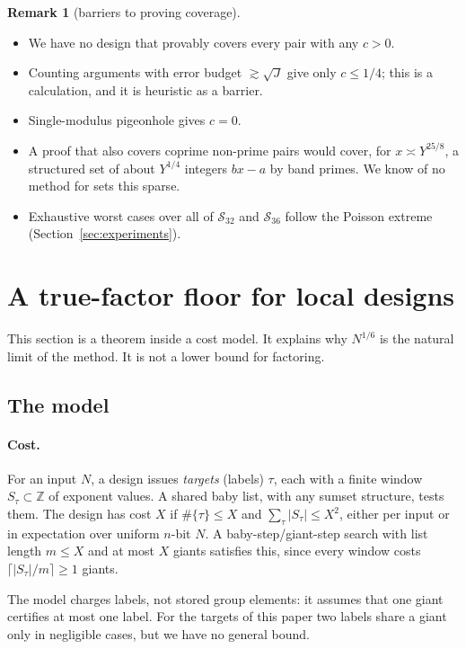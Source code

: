 \documentclass[11pt]{amsart}
\theoremstyle{definition}
\newtheorem{remark}[theorem]{Remark}
\newcommand{\Z}{\mathbb{Z}}
\begin{document}
\begin{remark}[barriers to proving coverage]
\begin{itemize}
\item We have no design that provably covers every pair with any $c>0$.
\item Counting arguments with error budget $\gtrsim\sqrt J$ give only $c\le1/4$; this is a
  calculation, and it is heuristic as a barrier.
\item Single-modulus pigeonhole gives $c=0$.
\item A proof that also covers coprime non-prime pairs would cover, for $x\asymp Y^{25/8}$, a
  structured set of about $Y^{1/4}$ integers $bx-a$ by band primes. We know of no method for sets
  this sparse.
\item Exhaustive worst cases over all of $\mathcal S_{32}$ and $\mathcal S_{36}$ follow the
  Poisson extreme (Section~\ref{sec:experiments}).
\end{itemize}
\end{remark}

\section{A true-factor floor for local designs}\label{sec:lower}

This section is a theorem inside a cost model. It explains why $N^{1/6}$ is the natural limit of
the method. It is not a lower bound for factoring.

\subsection{The model}
\paragraph{Cost.} For an input $N$, a design issues \emph{targets} (labels) $\tau$, each with a
finite window $S_\tau\subset\Z$ of exponent values. A shared baby list, with any sumset
structure, tests them. The design has cost $X$ if $\#\{\tau\}\le X$ and $\sum_\tau|S_\tau|\le
X^2$, either per input or in expectation over uniform $n$-bit $N$. A baby-step/giant-step search
with list length $m\le X$ and at most $X$ giants satisfies this, since every window costs
$\lceil|S_\tau|/m\rceil\ge1$ giants.

The model charges labels, not stored group elements: it assumes that one giant certifies at most
one label. For the targets of this paper two labels share a giant only in negligible cases, but
we have no general bound.
\end{document}
